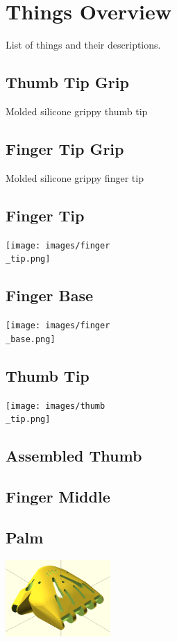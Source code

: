 \documentclass[11pt]{article}
\begin{document}
\newpage

\section{Things Overview}
List of things and their descriptions.

\hypertarget{thing_thumb\_tip\_grip}{\subsection{Thumb Tip Grip}}
Molded silicone grippy thumb tip

\hypertarget{thing_finger\_tip\_grip}{\subsection{Finger Tip Grip}}
Molded silicone grippy finger tip

\hypertarget{thing_finger\_tip}{\subsection{Finger Tip}}
\texttt{[image: images/finger\\\_tip.png]}

\hypertarget{thing_finger\_base}{\subsection{Finger Base}}
\texttt{[image: images/finger\\\_base.png]}

\hypertarget{thing_thumb\_tip}{\subsection{Thumb Tip}}
\texttt{[image: images/thumb\\\_tip.png]}

\hypertarget{thing_thumb\_assembly}{\subsection{Assembled Thumb}}

\hypertarget{thing_finger\_mid}{\subsection{Finger Middle}}

\hypertarget{thing_palm}{\subsection{Palm}}
\includegraphics[width=4cm]{images/palm.png}
\end{document}
